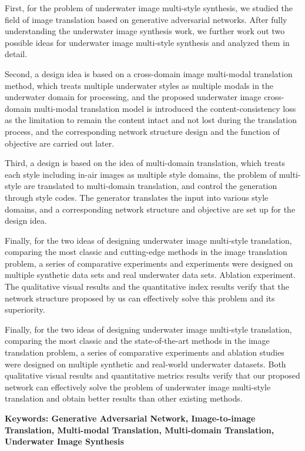 {First, for the problem of underwater image multi-style synthesis, we studied the field of image translation based on generative adversarial networks. After fully understanding the underwater image synthesis work, we further work out two possible ideas for underwater image multi-style synthesis and analyzed them in detail.

Second, a design idea is based on a cross-domain image multi-modal translation method, which treats multiple underwater styles as multiple modals in the underwater domain for processing, and the proposed underwater image cross-domain multi-modal translation model is introduced the content-consistency loss as the limitation to remain the content intact and not lost during the translation process, and the corresponding network structure design and the function of objective are carried out later.

Third, a design is based on the idea of multi-domain translation, which treats each style including in-air images as multiple style domains, the problem of multi-style are translated to multi-domain translation, and control the generation through style codes. The generator translates the input into various style domains, and a corresponding network structure and objective are set up for the design idea.

Finally, for the two ideas of designing underwater image multi-style translation, comparing the most classic and cutting-edge methods in the image translation problem, a series of comparative experiments and experiments were designed on multiple synthetic data sets and real underwater data sets. Ablation experiment. The qualitative visual results and the quantitative index results verify that the network structure proposed by us can effectively solve this problem and its superiority. 

Finally, for the two ideas of designing underwater image multi-style translation, comparing the most classic and the state-of-the-art methods in the image translation problem, a series of comparative experiments and ablation studies were designed on multiple synthetic and real-world underwater datasets. Both qualitative visual results and quantitative metrics results verify that our proposed network can effectively solve the problem of underwater image multi-style translation and obtain better results than other existing methods.

}
 
\vskip12bp
{\xiaosi\heiti\noindent 
\textbf{Keywords: Generative Adversarial Network, Image-to-image Translation, Multi-modal Translation, Multi-domain Translation, Underwater Image Synthesis}}
